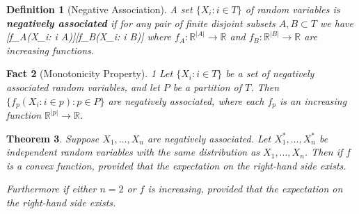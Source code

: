 \documentclass{article}
\newtheorem{theorem}{Theorem}
\newtheorem{fact}[theorem]{Fact}
\newtheorem{definition}[theorem]{Definition}
\newcommand*{\defn}[1]{\textbf{#1}}
\newcommand*{\R}[0]{\mathbb{R}}
\newcommand*{\E}[0]{\mathbf{E}}
\def\[#1\]{\begin{align*}#1\end{align*}}
\begin{document}

\begin{definition}[Negative Association]
  A set $\{X_i : i \in T\}$ of random variables is \defn{negatively associated} if for any pair of finite disjoint subsets $A, B \subset T$
  we have
  \[\E[f_A(X_i: i \in A)f_B(X_i: i \in B)] \le \E[f_A(X_i: i \in A)]\E[f_B(X_i: i \in B)]\]
  where $f_A : \R^{|A|} \to \R$ and $f_B : \R^{|B|} \to \R$ are increasing functions.
\end{definition}

\begin{fact}[Monotonicity Property]1
  Let $\{X_i : i \in T\}$ be a set of negatively associated random variables,
  and let $P$ be a partition of $T$.
  Then $\{f_p(X_i : i \in p) : p \in P\}$ are negatively associated,
  where each $f_p$ is an increasing function $\R^{|p|} \to \R$.
\end{fact}

\begin{theorem}
  \label{thm:na-convex}
  Suppose $X_1, \dots, X_n$ are negatively associated.
  Let $X_1^*, \dots, X_n^*$ be independent random variables with the same distribution as $X_1, \dots, X_n$.
  Then if $f$ is a convex function,
  \[\E{} \le \E{}\]
  provided that the expectation on the right-hand side exists.

  Furthermore if either $n = 2$ or $f$ is increasing,
  \[\E\left[f\left(\max_{1 \le k \le n} \sum_{i=1}^k X_i\right)\right] \le \E\left[f\left(\max_{1 \le k \le n} \sum_{i=1}^k X_i^*\right)\right]\]
  provided that the expectation on the right-hand side exists.
\end{theorem}
\end{document}
